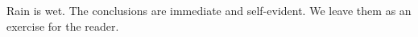 Rain is wet.  The conclusions are immediate and self-evident.  We
leave them as an exercise for the reader.
